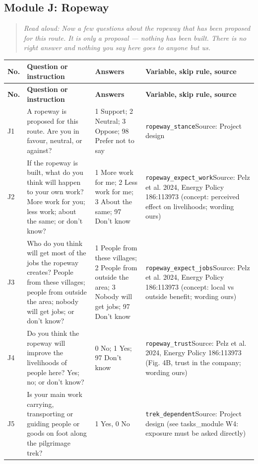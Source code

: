 \documentclass[10pt]{article}
\begin{document}
\subsection*{Module J: Ropeway}
\begin{quote}\small\textit{Read aloud: Now a few questions about the ropeway that has been proposed for this route. It is only a proposal — nothing has been built. There is no right answer and nothing you say here goes to anyone but us.}\end{quote}
{\scriptsize
\begin{longtable}{p{0.8cm}p{6.4cm}p{3.6cm}p{5.8cm}}
\toprule
\textbf{No.} & \textbf{Question or instruction} & \textbf{Answers} & \textbf{Variable, skip rule, source} \\
\midrule
\endfirsthead
\toprule
\textbf{No.} & \textbf{Question or instruction} & \textbf{Answers} & \textbf{Variable, skip rule, source} \\
\midrule
\endhead
J1 & A ropeway is proposed for this route. Are you in favour, neutral, or against? & 1 Support; 2 Neutral; 3 Oppose; 98 Prefer not to say & \texttt{ropeway\_stance}\newline Source: Project design \\
J2 & If the ropeway is built, what do you think will happen to your own work? More work for you; less work; about the same; or don't know? & 1 More work for me; 2 Less work for me; 3 About the same; 97 Don't know & \texttt{ropeway\_expect\_work}\newline Source: Pelz et al. 2024, Energy Policy 186:113973 (concept: perceived effect on livelihoods; wording ours) \\
J3 & Who do you think will get most of the jobs the ropeway creates? People from these villages; people from outside the area; nobody will get jobs; or don't know? & 1 People from these villages; 2 People from outside the area; 3 Nobody will get jobs; 97 Don't know & \texttt{ropeway\_expect\_jobs}\newline Source: Pelz et al. 2024, Energy Policy 186:113973 (concept: local vs outside benefit; wording ours) \\
J4 & Do you think the ropeway will improve the livelihoods of people here? Yes; no; or don't know? & 0 No; 1 Yes; 97 Don't know & \texttt{ropeway\_trust}\newline Source: Pelz et al. 2024, Energy Policy 186:113973 (Fig. 4B, trust in the company; wording ours) \\
J5 & Is your main work carrying, transporting or guiding people or goods on foot along the pilgrimage trek? & 1 Yes, 0 No & \texttt{trek\_dependent}\newline Source: Project design (see tasks\_module W4: exposure must be asked directly) \\
\bottomrule
\end{longtable}
}
\end{document}
